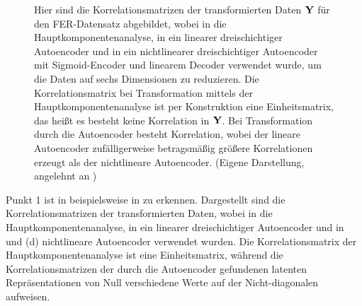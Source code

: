 \begin{figure}[ht]
	\centering
	
	\caption[Korrelationsmatrizen der transformierten Daten $\mat{Y}$ für den FER-Datensatz von vier Methoden]{Hier sind die Korrelationsmatrizen der transformierten Daten $\mat{Y}$ für den FER-Datensatz abgebildet, wobei in \captiona die Hauptkomponentenanalyse, in \captionb ein linearer dreischichtiger Autoencoder und in \captionc ein nichtlinearer dreischichtiger Autoencoder mit Sigmoid-Encoder und linearem Decoder verwendet wurde, um die Daten auf sechs Dimensionen zu reduzieren. Die Korrelationsmatrix bei Transformation mittels der Hauptkomponentenanalyse ist per Konstruktion eine Einheitsmatrix, das heißt es besteht keine Korrelation in $\mat{Y}$. Bei Transformation durch die Autoencoder besteht Korrelation, wobei der lineare Autoencoder zufälligerweise betragsmäßig größere Korrelationen erzeugt als der nichtlineare Autoencoder.  (Eigene Darstellung, angelehnt an \textcite[5]{Plaut.2018})}
	\label{fig:Korrelationsmatrizen}
\end{figure}
Punkt 1 ist in beispielsweise in  zu erkennen. Dargestellt sind die Korrelationsmatrizen der transformierten Daten, wobei in \captiona die Hauptkomponentenanalyse, in \captionb ein linearer dreischichtiger Autoencoder und in \captionc und (d) nichtlineare Autoencoder verwendet wurden. Die Korrelationsmatrix der Hauptkomponentenanalyse ist eine Einheitsmatrix, während die Korrelationsmatrizen der durch die Autoencoder gefundenen latenten Repräsentationen von Null verschiedene Werte auf der Nicht-diagonalen aufweisen.

